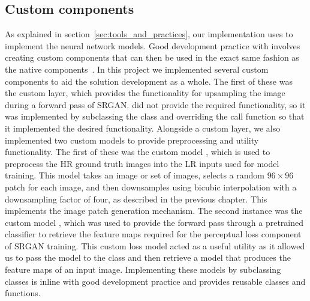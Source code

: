 \subsection{Custom  components}
As explained in section~\ref{sec:tools_and_practices}, our implementation uses  to implement the neural network models. Good development practice with  involves creating custom components that can then be used in the exact same fashion as the native  components~\cite{keras}. In this project we implemented several custom  components to aid the solution development as a whole. The first of these was the custom  layer, which provides the functionality for upsampling the image during a forward pass of SRGAN.\@{} did not provide the required functionality, so it was implemented by subclassing the  class and overriding the call function so that it implemented the desired functionality. Alongside a custom layer, we also implemented two custom models to provide preprocessing and utility functionality. The first of these was the custom model , which is used to preprocess the HR ground truth images into the LR inputs used for model training. This model takes an image or set of images, selects a random $96 \times 96$ patch for each image, and then downsamples using bicubic interpolation with a downsampling factor of four, as described in the previous chapter. This implements the image patch generation mechanism. The second instance was the custom model , which was used to provide the forward pass through a pretrained classifier to retrieve the feature maps required for the perceptual loss component of SRGAN training. This custom loss model acted as a useful utility as it allowed us to pass the model to the class and then retrieve a model that produces the feature maps of an input image. Implementing these models by subclassing  classes is inline with good development practice and provides reusable classes and functions.

